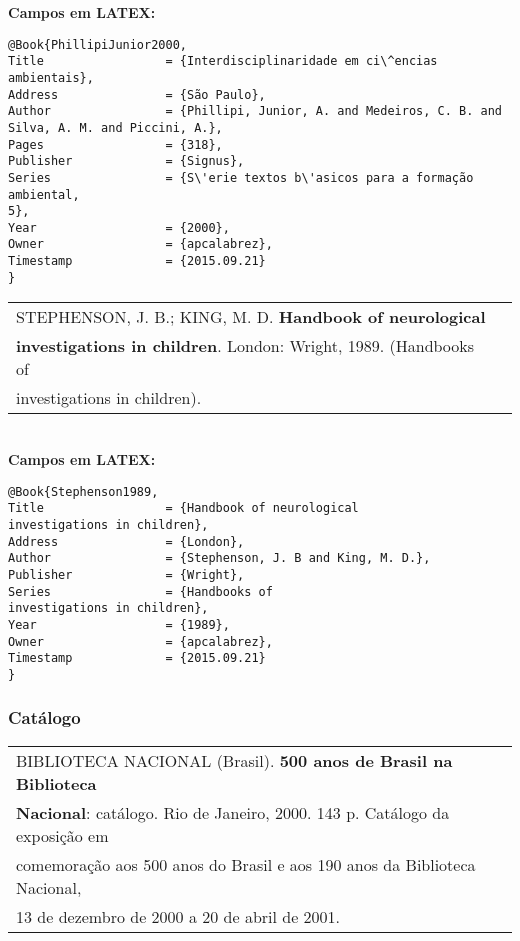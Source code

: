 \textbf{Campos em LATEX:}

\begin{verbatim}
@Book{PhillipiJunior2000,
Title                 = {Interdisciplinaridade em ci\^encias ambientais},
Address               = {São Paulo},
Author                = {Phillipi, Junior, A. and Medeiros, C. B. and 
Silva, A. M. and Piccini, A.},
Pages                 = {318},
Publisher             = {Signus},
Series                = {S\'erie textos b\'asicos para a formação ambiental, 
5},
Year                  = {2000},
Owner                 = {apcalabrez},
Timestamp             = {2015.09.21}
}
\end{verbatim}

\begin{tabular}{|l|c|} \hline
STEPHENSON, J. B.; KING, M. D. \textbf{ Handbook of neurological}\\ \textbf{investigations in children}. London: Wright, 1989. (Handbooks of \\
investigations in children). \\\hline
\end{tabular}\\

\textbf{Campos em LATEX:}

\begin{verbatim}
@Book{Stephenson1989,
Title                 = {Handbook of neurological
investigations in children},
Address               = {London},
Author                = {Stephenson, J. B and King, M. D.},
Publisher             = {Wright},
Series                = {Handbooks of
investigations in children},
Year                  = {1989},
Owner                 = {apcalabrez},
Timestamp             = {2015.09.21}
}
\end{verbatim}


\subsubsection{Cat\'alogo}

\begin{tabular}{|l|c|} \hline
	BIBLIOTECA NACIONAL (Brasil). \textbf{500 anos de Brasil na Biblioteca }\\ \textbf{Nacional}: cat\'alogo. Rio de Janeiro, 2000. 143 p. Cat\'alogo da exposição em \\comemoração aos 500  anos do Brasil e aos 190 anos da Biblioteca Nacional, \\13 de dezembro de 2000 a 20 de abril de 2001.    \\\hline
\end{tabular}\\

